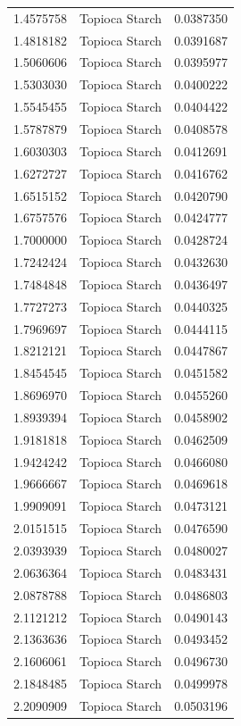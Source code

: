 \documentclass[
  12pt,
]{article}
\begin{document}
{\begin{longtable}[]{@{}rlr@{}}
1.4575758 & Topioca Starch & 0.0387350 \\
1.4818182 & Topioca Starch & 0.0391687 \\
1.5060606 & Topioca Starch & 0.0395977 \\
1.5303030 & Topioca Starch & 0.0400222 \\
1.5545455 & Topioca Starch & 0.0404422 \\
1.5787879 & Topioca Starch & 0.0408578 \\
1.6030303 & Topioca Starch & 0.0412691 \\
1.6272727 & Topioca Starch & 0.0416762 \\
1.6515152 & Topioca Starch & 0.0420790 \\
1.6757576 & Topioca Starch & 0.0424777 \\
1.7000000 & Topioca Starch & 0.0428724 \\
1.7242424 & Topioca Starch & 0.0432630 \\
1.7484848 & Topioca Starch & 0.0436497 \\
1.7727273 & Topioca Starch & 0.0440325 \\
1.7969697 & Topioca Starch & 0.0444115 \\
1.8212121 & Topioca Starch & 0.0447867 \\
1.8454545 & Topioca Starch & 0.0451582 \\
1.8696970 & Topioca Starch & 0.0455260 \\
1.8939394 & Topioca Starch & 0.0458902 \\
1.9181818 & Topioca Starch & 0.0462509 \\
1.9424242 & Topioca Starch & 0.0466080 \\
1.9666667 & Topioca Starch & 0.0469618 \\
1.9909091 & Topioca Starch & 0.0473121 \\
2.0151515 & Topioca Starch & 0.0476590 \\
2.0393939 & Topioca Starch & 0.0480027 \\
2.0636364 & Topioca Starch & 0.0483431 \\
2.0878788 & Topioca Starch & 0.0486803 \\
2.1121212 & Topioca Starch & 0.0490143 \\
2.1363636 & Topioca Starch & 0.0493452 \\
2.1606061 & Topioca Starch & 0.0496730 \\
2.1848485 & Topioca Starch & 0.0499978 \\
2.2090909 & Topioca Starch & 0.0503196 \\

\end{longtable}}
\end{document}
